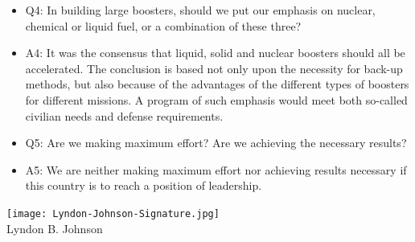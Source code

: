 \documentclass[letterpaper,11pt]{texMemo}
\begin{document}
\begin{itemize}
 \item Q4: In building large boosters, should we put our emphasis on nuclear, chemical or liquid fuel, or a combination of these three?
 \item A4: It was the consensus that liquid, solid and nuclear boosters should all be accelerated.  The conclusion is based not only upon the necessity for back-up methods, but also because of the advantages of the different types of boosters for different missions.  A program of such emphasis would meet both so-called civilian needs and defense requirements.
 \item Q5: Are we making maximum effort?  Are we achieving the necessary results?
 \item A5: We are neither making maximum effort nor achieving results necessary if this country is to reach a position of leadership.
\end{itemize}

\texttt{[image: Lyndon-Johnson-Signature.jpg]}\\
\hspace*{0.9in} Lyndon B. Johnson
\end{document}
